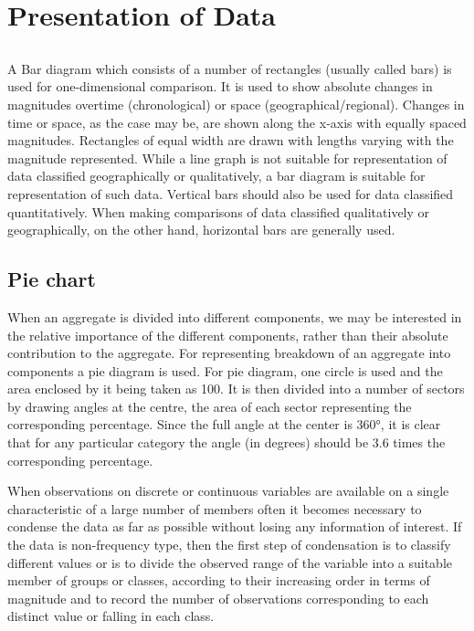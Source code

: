 \section{Presentation of Data}

\subsection{}

A Bar diagram which consists of a number of rectangles (usually called bars) is used for 
one-dimensional comparison. It is used to show absolute changes in magnitudes overtime 
(chronological) or space (geographical/regional). Changes in time or space, as the case may 
be, are shown along the x-axis with equally spaced magnitudes. Rectangles of equal width 
are drawn with lengths varying with the magnitude represented. While a line graph is not 
suitable for representation of data classified geographically or qualitatively, a bar diagram 
is suitable for representation of such data. Vertical bars should also be used for data classified quantitatively. When making 
comparisons of data classified qualitatively or geographically, on the other hand, horizontal 
bars are generally used. 

\subsection*{Pie chart}

When an aggregate is divided into different components, we may be interested in the 
relative importance of the different components, rather than their absolute contribution to 
the aggregate. For representing breakdown of an aggregate into components a pie diagram 
is used. For pie diagram, one circle is used and the area enclosed by it being taken as 100. It 
is then divided into a number of sectors by drawing angles at the centre, the area of each 
sector representing the corresponding percentage. Since the full angle at the center is  
360°, it is clear that for any particular category the angle (in degrees) should be 3.6 times 
the corresponding percentage.

When observations on discrete or continuous variables are available on a single 
characteristic of a large number of members often it becomes necessary to condense the 
data as far as possible without losing any information of interest. If the data is 
non-frequency type, then the first step of condensation is to classify different values or is 
to divide the observed range of the variable into a suitable member of groups or classes, 
according to their increasing order in terms of magnitude and to record the number of 
observations corresponding to each distinct value or falling in each class. 

